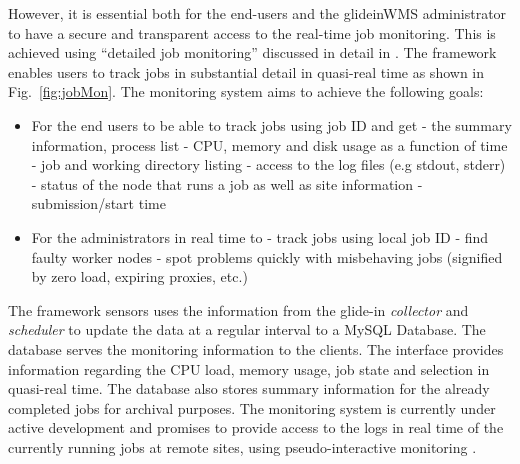 \documentclass[a4paper]{jpconf}
\begin{document}
However, it is essential both for the end-users and the glideinWMS administrator to have 
a secure and transparent access to the real-time job monitoring. This is achieved using
``detailed job monitoring'' discussed in detail in \cite{bib:cms_jobmon}. The framework enables users to track jobs 
in substantial detail in quasi-real time as shown in Fig.~\ref{fig:jobMon}. The monitoring system aims to 
achieve the following goals:
\begin {itemize}
\item 
For the end users to be able to track jobs using job ID and get 
\subitem
- the summary information, process list
\subitem
- CPU, memory and disk usage as a function of time
\subitem
- job and working directory listing
\subitem
- access to the log files (e.g stdout, stderr)
\subitem
- status of the node that runs a job as well as site information
\subitem
- submission/start time
\item
For the administrators in real time to
\subitem
 - track jobs using local job ID
\subitem
- find faulty worker nodes
\subitem
- spot problems quickly with misbehaving jobs (signified by zero load, expiring proxies, etc.)
\end{itemize}
The framework sensors uses the information from the glide-in \emph{collector} and \emph{scheduler} to
update the data at a regular interval to a MySQL Database. The database serves the monitoring
information to the clients. The interface provides information regarding the CPU load, memory usage, 
job state and selection in quasi-real time. The database also stores summary information for the already completed 
jobs for archival purposes. The monitoring system is currently under active development and promises to provide access to 
the logs in real time of the currently running jobs at remote sites, using 
pseudo-interactive monitoring \cite{bib:pseudo_mon}.
\end{document}
